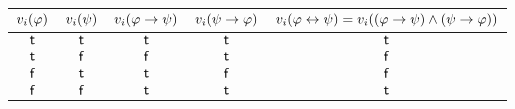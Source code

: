 \begin{myCorollary}
  \begin{table}
    \begin{tabular}{|c|c|c|c|c|}\hline
      $v_i(\varphi)$ & $v_i(\psi)$ & $v_i(\varphi \to \psi)$ & $v_i(\psi \to \varphi)$ & $v_i(\varphi \leftrightarrow \psi) = v_i((\varphi \to \psi) \land (\psi \to \varphi))$ \\ \hline
      $\mathsf{t}$                                  & $\mathsf{t}$                               & $\mathsf{t}$                                           & $\mathsf{t}$                                           & $\mathsf{t}$                                                                                                                              \\ \hline
      $\mathsf{t}$                                  & $\mathsf{f}$                              & $\mathsf{f}$                                          & $\mathsf{t}$                                           & $\mathsf{f}$                                                                                                                             \\ \hline
      $\mathsf{f}$                                 & $\mathsf{t}$                               & $\mathsf{t}$                                           & $\mathsf{f}$                                          & $\mathsf{f}$                                                                                                                             \\ \hline
      $\mathsf{f}$                                 & $\mathsf{f}$                              & $\mathsf{t}$                                           & $\mathsf{t}$                                           & $\mathsf{t}$                                                                                                                              \\ \hline
    \end{tabular}
  \end{table}
\end{myCorollary}
